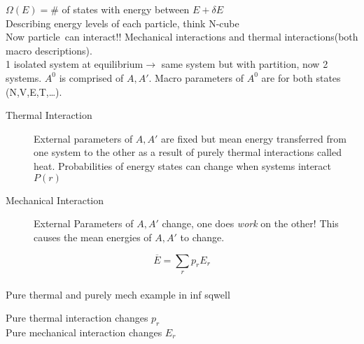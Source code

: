 \documentclass{article}
\def \pa {particle\ }
\begin{document}
\begin{lecture}
    $\Omega(E)=\#$ of states with energy between $E+\delta E$
    \\
    Describing energy levels of each particle, think N-cube
    \\
    Now \pa can interact!! Mechanical interactions and thermal interactions(both macro descriptions). 
    \\
    1 isolated system at equilibrium$\rightarrow$ same system but with partition, now 2 systems. $A^0$ is comprised of $A,A'$. Macro parameters of $A^0$ are for both states (N,V,E,T,\ldots).
    \\
    \begin{description}
        \item [Thermal Interaction] External parameters of $A,A'$ are fixed but mean energy transferred from one system to the other as a result of purely thermal interactions called heat. Probabilities of energy states can change when systems interact $P(r)$
        \item [Mechanical Interaction] External Parameters of $A,A'$ change, one does \emph{work} on the other! This causes the mean energies of $A,A'$ to change. 
    \end{description}
    $$\overline{E}=\sum_rp_rE_r$$
    \\
    Pure thermal and purely mech example in inf sqwell
\end{lecture}
\begin{lecture}[Jan 24]
    Pure thermal interaction changes $p_r$
    \\
    Pure mechanical interaction changes $E_r$
\end{lecture}
\end{document}
